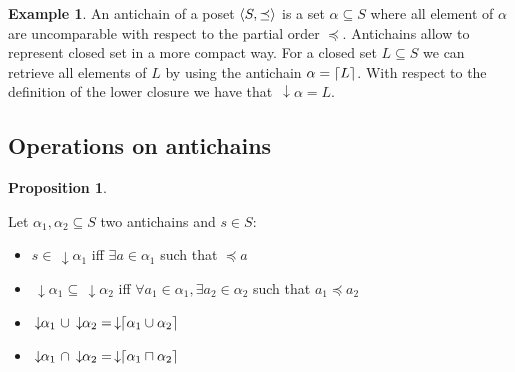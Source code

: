 \documentclass[letterpaper]{article}
\DeclarePairedDelimiter{\ceil}{\lceil}{\rceil}
\DeclarePairedDelimiter{\tuple}{\langle}{\rangle}
\newcommand{\darrow}{\, \downarrow \!\!}
\theoremstyle{definition}
\newtheorem{proposition}{Proposition}[subsection]
\newtheorem{example}{Example}[subsection]
\begin{document}
\begin{example}
An antichain of a poset $\tuple{S, \preceq}$
is a set $\alpha \subseteq S$ where all element of $\alpha$
are uncomparable with respect to the partial order $\preceq$.
Antichains allow to represent closed set in a more compact way.
For a closed set $L \subseteq S$ we can retrieve all elements of $L$ by using
the antichain $\alpha = \ceil{L}$. With respect
to the definition of the lower closure we have that $\darrow \alpha = L$.

\subsection{Operations on antichains}




\begin{proposition}

\label{antichains_ops}

Let $\alpha_1, \alpha_2 \subseteq S$ two antichains and $s \in S$:

\begin{itemize}
    \item $s \in \darrow \alpha_1$
    iff $\exists a \in \alpha_1$ such that $\preceq a$
    \item $\darrow \alpha_1 \subseteq \darrow \alpha_2$
    iff $\forall a_1 \in \alpha_1,
    \exists a_2 \in \alpha_2$ such that $a_1 \preceq a_2$
    \item $ \darrow \alpha_1 \ \cup \darrow \alpha_2 =
    \darrow \ceil{\alpha_1 \cup \alpha_2}$
    \item $\darrow \alpha_1 \ \cap \darrow \alpha_2 =
    \darrow \ceil{\alpha_1 \sqcap \alpha_2}$


\end{itemize}

\end{proposition}



%
%


\end{example}
\end{document}
